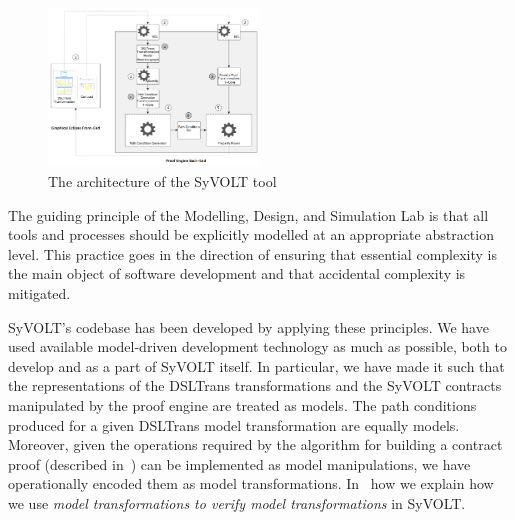 \begin{figure}
\centering
\includegraphics[width=0.5\textwidth]{figures/syvolt_arch}
\caption{The architecture of the SyVOLT tool}
\label{fig:arch}
\end{figure}

The guiding principle of the Modelling, Design, and Simulation Lab is that all
tools and processes should be explicitly modelled at an appropriate abstraction level.
This practice goes in the direction of ensuring that essential
complexity is the main object of software development and that accidental
complexity is mitigated.

SyVOLT's codebase has been developed by applying these principles. We have used
available model-driven development technology as much as possible, both to
develop and as a part of SyVOLT itself. In particular, we have made it such that
the representations of the DSLTrans transformations and the SyVOLT contracts
manipulated by the proof engine are treated as models. The path conditions
produced for a given DSLTrans model transformation are equally models. Moreover, given the
operations required by the algorithm for building a contract proof (described
in~\cite{Lucio2014}) can be implemented as model manipulations, we have
operationally encoded them as model transformations.
In~\cite{LucioVang} how we explain how we use \emph{model transformations to
verify model transformations} in SyVOLT.

